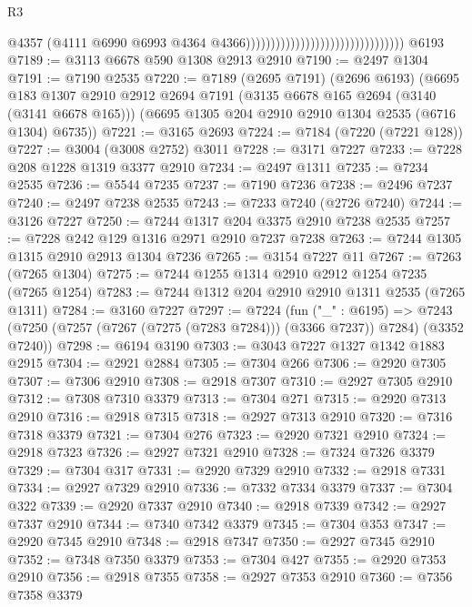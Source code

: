 \begin{lexlean}{R3}
\begin{coremodule}
                                                                  @4357
                                                                  (@4111
                                                                    @6990
                                                                    @6993
                                                                    @4364
                                                                    @4366))))))))))))))))))))))))))))))))
    @6193
@7189 := @3113 @6678 @590 @1308 @2913 @2910
@7190 := @2497 @1304
@7191 := @7190 @2535
@7220 := @7189
    (@2695 @7191)
    (@2696 @6193)
    (@6695
      @183
      @1307
      @2910
      @2912
      @2694
      @7191
      (@3135 @6678 @165 @2694 (@3140 (@3141 @6678 @165)))
      (@6695 @1305 @204 @2910 @2910 @1304 @2535 (@6716 @1304) @6735))
@7221 := @3165 @2693
@7224 := @7184 (@7220 (@7221 @128))
@7227 := @3004 (@3008 @2752) @3011
@7228 := @3171 @7227
@7233 := @7228 @208 @1228 @1319 @3377 @2910
@7234 := @2497 @1311
@7235 := @7234 @2535
@7236 := @5544 @7235
@7237 := @7190 @7236
@7238 := @2496 @7237
@7240 := @2497 @7238 @2535
@7243 := @7233 @7240 (@2726 @7240)
@7244 := @3126 @7227
@7250 := @7244 @1317 @204 @3375 @2910 @7238 @2535
@7257 := @7228 @242 @129 @1316 @2971 @2910 @7237 @7238
@7263 := @7244 @1305 @1315 @2910 @2913 @1304 @7236
@7265 := @3154 @7227 @11
@7267 := @7263 (@7265 @1304)
@7275 := @7244 @1255 @1314 @2910 @2912 @1254 @7235 (@7265 @1254)
@7283 := @7244 @1312 @204 @2910 @2910 @1311 @2535 (@7265 @1311)
@7284 := @3160 @7227
@7297 := @7224
    (fun ("_" : @6195) =>
    @7243 (@7250 (@7257 (@7267 (@7275 (@7283 @7284))) (@3366 @7237)) @7284) (@3352 @7240))
@7298 := @6194 @3190
@7303 := @3043 @7227 @1327 @1342 @1883 @2915
@7304 := @2921 @2884
@7305 := @7304 @266
@7306 := @2920 @7305
@7307 := @7306 @2910
@7308 := @2918 @7307
@7310 := @2927 @7305 @2910
@7312 := @7308 @7310 @3379
@7313 := @7304 @271
@7315 := @2920 @7313 @2910
@7316 := @2918 @7315
@7318 := @2927 @7313 @2910
@7320 := @7316 @7318 @3379
@7321 := @7304 @276
@7323 := @2920 @7321 @2910
@7324 := @2918 @7323
@7326 := @2927 @7321 @2910
@7328 := @7324 @7326 @3379
@7329 := @7304 @317
@7331 := @2920 @7329 @2910
@7332 := @2918 @7331
@7334 := @2927 @7329 @2910
@7336 := @7332 @7334 @3379
@7337 := @7304 @322
@7339 := @2920 @7337 @2910
@7340 := @2918 @7339
@7342 := @2927 @7337 @2910
@7344 := @7340 @7342 @3379
@7345 := @7304 @353
@7347 := @2920 @7345 @2910
@7348 := @2918 @7347
@7350 := @2927 @7345 @2910
@7352 := @7348 @7350 @3379
@7353 := @7304 @427
@7355 := @2920 @7353 @2910
@7356 := @2918 @7355
@7358 := @2927 @7353 @2910
@7360 := @7356 @7358 @3379

\end{coremodule}
\end{lexlean}
